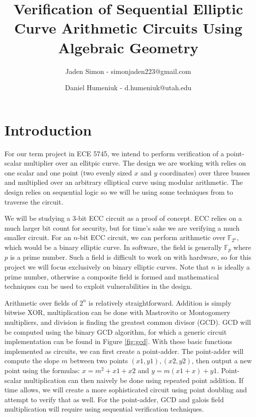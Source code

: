 \documentclass[12pt]{report}
\title{Verification of Sequential Elliptic Curve Arithmetic Circuits Using Algebraic Geometry}
\author{Jaden Simon - simonjaden223@gmail.com \\ \and
	   Daniel Humeniuk - d.humeniuk@utah.edu}
\begin{document}
\maketitle

\section{Introduction}

For our term project in ECE 5745, we intend to perform verification of a point-scalar multiplier over an ellitpic curve. The design we are working with relies on  one scalar and one point (two evenly sized $x$ and $y$ coordinates) over three busses and multiplied over an arbitrary elliptical curve using modular arithmetic. The design relies on sequential logic so we will be using some techniques from \cite{Kalla} to traverse the circuit.

We will be studying a 3-bit ECC circuit as a proof of concept. ECC relies on a much larger bit count for security, but for time's sake we are verifying a much smaller circuit. For an $n$-bit ECC circuit, we can perform arithmetic over $\mathbb{F}_{2^n}$, which would be a binary elliptic curve. In software, the field is generally $\mathbb{F}_{p}$ where $p$ is a prime number. Such a field is difficult to work on with hardware, so for this project we will focus exclusively on binary elliptic curves. Note that $n$ is ideally a prime number, otherwise a composite field is formed and mathematical techniques can be used to exploit vulnerabilities in the design. 

Arithmetic over fields of $2^n$ is relatively straightforward. Addition is simply bitwise XOR, multiplication can be done with Mastrovito or Montogomery multipliers, and division is finding the greatest common divisor (GCD). GCD will be computed using the binary GCD algorithm, for which a generic circuit implementation can be found in Figure \ref{fig:gcd}. With these basic functions implemented as circuits, we can first create a point-adder. The point-adder will compute the slope $m$ between two points $(x1, y1), (x2, y2)$, then output a new point using the formulas: $x = m^2 + x1 + x2$ and $y = m(x1 + x) + y1$. Point-scalar multiplication can then naively be done using repeated point addition. If time allows, we will create a more sophisticated circuit using point doubling and attempt to verify that as well. For the point-adder, GCD and galois field multiplication will require using sequential verification techniques. 
\end{document}
